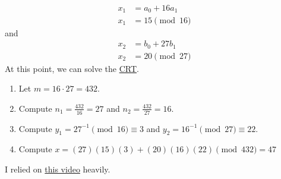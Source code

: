 {    \begin{align*}
        x_1 & =  a_0 + 16a_1 \\
        x_1 & = 15 \pmod{16}
    \end{align*} and \begin{align*}
        x_2 & = b_0 + 27b_1  \\
        x_2 & = 20 \pmod{27}
    \end{align*}
    At this point, we can solve the \hyperref[thm:Chinese Remainder]{CRT}.
    \begin{enumerate}[label=\arabic*.]
        \item Let \(m = 16 \cdot 27 = 432\).
        \item Compute \(n_1 = \frac{432}{16} = 27\) and \(n_2 = \frac{432}{27} = 16\).
        \item Compute \(y_1 = 27^{-1} \pmod{16} \equiv 3\) and \(y_2 = 16^{-1} \pmod{27} \equiv 22\).
        \item Compute \(x = (27)(15)(3) + (20)(16)(22) \pmod{432} = 47\)
    \end{enumerate} I relied on \href{https://www.youtube.com/watch?v=CHfP5tBbiAg}{this video} heavily.
}